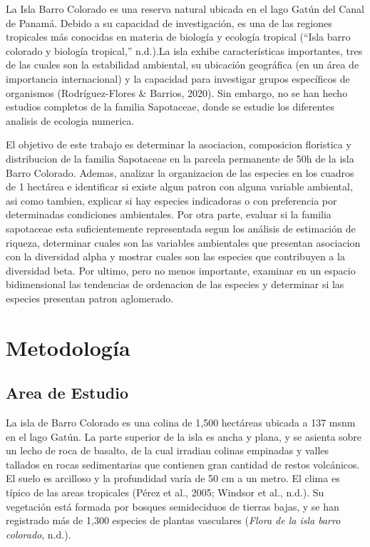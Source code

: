 \documentclass[11pt,]{article}
\begin{document}
La Isla Barro Colorado es una reserva natural ubicada en el lago Gatún
del Canal de Panamá. Debido a su capacidad de investigación, es una de
las regiones tropicales más conocidas en materia de biología y ecología
tropical (``Isla barro colorado y biología tropical,'' n.d.).La isla
exhibe características importantes, tres de las cuales son la
estabilidad ambiental, su ubicación geográfica (en un área de
importancia internacional) y la capacidad para investigar grupos
específicos de organismos (Rodríguez-Flores \& Barrios, 2020). Sin
embargo, no se han hecho estudios completos de la familia Sapotaceae,
donde se estudie los diferentes analisis de ecologia numerica.

El objetivo de este trabajo es determinar la asociacion, composicion
floristica y distribucion de la familia Sapotaceae en la parcela
permanente de 50h de la isla Barro Colorado. Ademas, analizar la
organizacion de las especies en los cuadros de 1 hectárea e identificar
si existe algun patron con alguna variable ambiental, asi como tambien,
explicar si hay especies indicadoras o con preferencia por determinadas
condiciones ambientales. Por otra parte, evaluar si la familia
sapotaceae esta suficientemente representada segun los análisis de
estimación de riqueza, determinar cuales son las variables ambientales
que presentan asociacion con la diversidad alpha y mostrar cuales son
las especies que contribuyen a la diversidad beta. Por ultimo, pero no
menos importante, examinar en un espacio bidimensional las tendencias de
ordenacion de las especies y determinar si las especies presentan patron
aglomerado.

\section{Metodología}\label{metodologuxeda}

\subsection{Area de Estudio}\label{area-de-estudio}

La isla de Barro Colorado es una colina de 1,500 hectáreas ubicada a 137
msnm en el lago Gatún. La parte superior de la isla es ancha y plana, y
se asienta sobre un lecho de roca de basalto, de la cual irradian
colinas empinadas y valles tallados en rocas sedimentarias que contienen
gran cantidad de restos volcánicos. El suelo es arcilloso y la
profundidad varía de 50 cm a un metro. El clima es típico de las areas
tropicales (Pérez et al., 2005; Windsor et al., n.d.). Su vegetación
está formada por bosques semideciduos de tierras bajas, y se han
registrado más de 1,300 especies de plantas vasculares (\emph{Flora de
la isla barro colorado}, n.d.).
\end{document}
